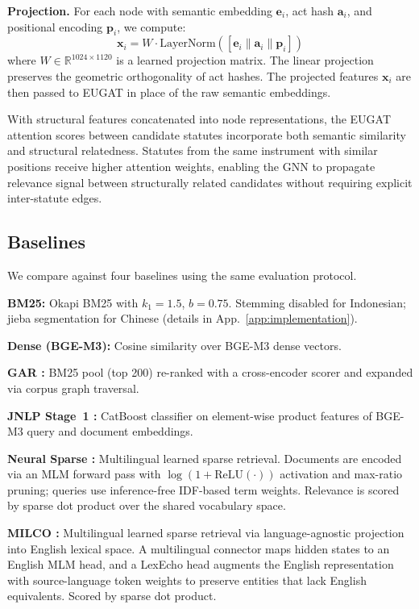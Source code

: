 \noindent\textbf{Projection.} For each node with semantic embedding $\mathbf{e}_i$, act hash $\mathbf{a}_i$, and positional encoding $\mathbf{p}_i$, we compute:
\begin{equation}
\mathbf{x}_i = W \cdot \text{LayerNorm}([\mathbf{e}_i \| \mathbf{a}_i \| \mathbf{p}_i])
\label{eq:struct-proj}
\end{equation}
where $W \in \mathbb{R}^{1024 \times 1120}$ is a learned projection matrix. The linear projection preserves the geometric orthogonality of act hashes. The projected features $\mathbf{x}_i$ are then passed to EUGAT in place of the raw semantic embeddings.

With structural features concatenated into node representations, the EUGAT attention scores between candidate statutes incorporate both semantic similarity and structural relatedness. Statutes from the same instrument with similar positions receive higher attention weights, enabling the GNN to propagate relevance signal between structurally related candidates without requiring explicit inter-statute edges.

\subsection{Baselines}

We compare against four baselines using the same evaluation protocol.

\noindent\textbf{BM25:} Okapi BM25 with $k_1=1.5$, $b=0.75$. Stemming disabled for Indonesian; jieba segmentation for Chinese (details in App.~\ref{app:implementation}).

\noindent\textbf{Dense (BGE-M3):} Cosine similarity over BGE-M3 dense vectors.

\noindent\textbf{GAR \citep{gar}:} BM25 pool (top 200) re-ranked with a cross-encoder scorer and expanded via corpus graph traversal.

\noindent\textbf{JNLP Stage~1 \citep{jnlp}:} CatBoost classifier on element-wise product features of BGE-M3 query and document embeddings.

\noindent\textbf{Neural Sparse \citep{opensearch_sparse}:} Multilingual learned sparse retrieval. Documents are encoded via an MLM forward pass with $\log(1 + \text{ReLU}(\cdot))$ activation and max-ratio pruning; queries use inference-free IDF-based term weights. Relevance is scored by sparse dot product over the shared vocabulary space.

\noindent\textbf{MILCO \citep{milco}:} Multilingual learned sparse retrieval via language-agnostic projection into English lexical space. A multilingual connector maps hidden states to an English MLM head, and a LexEcho head augments the English representation with source-language token weights to preserve entities that lack English equivalents. Scored by sparse dot product.


